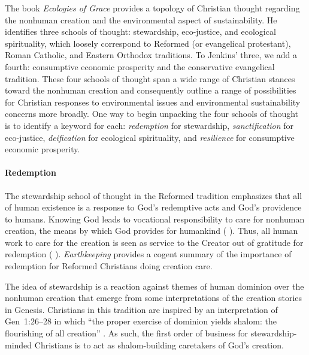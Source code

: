 \documentclass[12pt]{article}
\begin{document}
The book \emph{Ecologies of Grace} \autocite{Jenkins:2008}
provides a topology of Christian thought regarding the 
nonhuman creation and the
environmental aspect of sustainability.
He identifies three schools of thought:
stewardship, 
eco-justice, and 
ecological spirituality,
which loosely correspond to 
Reformed (or evangelical protestant), 
Roman Catholic, and 
Eastern Orthodox 
traditions.
To Jenkins' three, we add a fourth:
consumptive economic prosperity and
the conservative evangelical tradition. 
These four schools of thought 
span a wide range of Christian stances toward the nonhuman creation
and 
consequently outline a range of possibilities 
for Christian responses to environmental issues
and environmental sustainability concerns more broadly.
One way to begin unpacking the four schools of thought 
is to identify a keyword for each:
\emph{redemption} for stewardship, 
\emph{sanctification} for eco-justice,
\emph{deification} for ecological spirituality, and
\emph{resilience} for consumptive economic prosperity.

\paragraph{Redemption} 
\label{sec:redemption}

The stewardship school of thought in the Reformed tradition
emphasizes that all of human existence
is a response to God's redemptive acts
and God's providence to humans.
Knowing God leads to vocational responsibility 
to care for nonhuman creation,
the means by which God provides for humankind  %
(\textcite{Jenkins:2008} \textcite[19]{Jenkins:2008}). 
Thus, all human work to care for the creation 
is seen as service to the Creator
out of gratitude for redemption (\textcite{Jenkins:2008} \textcite[77]{Jenkins:2008}).
\emph{Earthkeeping} \autocite{Wilkenson:1980aa} provides a cogent summary
of the importance of redemption for Reformed Christians doing creation care.

The idea of stewardship is a reaction against themes of human dominion over the nonhuman creation
that emerge from some interpretations of the creation stories in Genesis.
Christians in this tradition are inspired by an interpretation of Gen~1:26–28 in which 
``the proper exercise of dominion yields shalom: the flourishing of all creation'' \autocite{BoumaPrediger:2019}.
As such, the first order of business for stewardship-minded Christians
is to act as shalom-building caretakers of God's creation.
\end{document}
